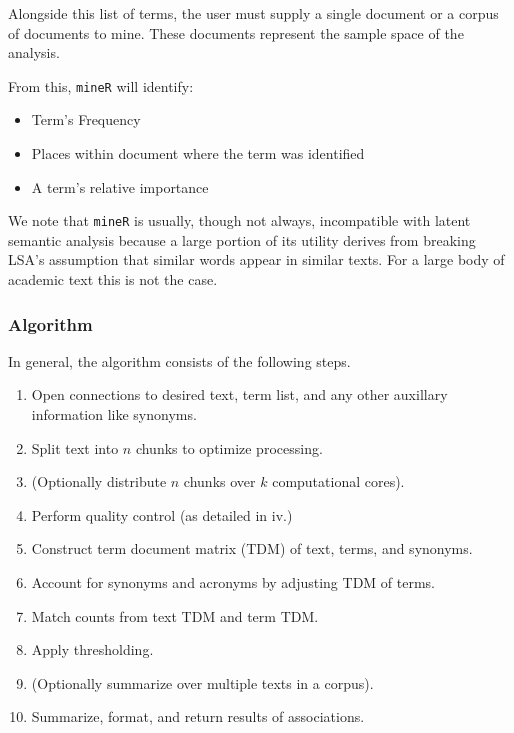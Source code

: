\documentclass[twoside]{article}
\begin{document}
Alongside this list of terms, the user must supply a single document or a corpus of documents to mine. These documents represent the sample space of the analysis.

From this, \texttt{mineR} will identify:

\begin{itemize}
\item Term's Frequency
\item Places within document where the term was identified
\item A term's relative importance

\end{itemize}

We note that \texttt{mineR} is usually, though not always, incompatible with latent semantic analysis because a large portion of its utility derives from breaking LSA's assumption that similar words appear in similar texts. For a large body of academic text this is not the case.

\subsubsection{Algorithm}

In general, the algorithm consists of the following steps.

\begin{enumerate}
\item Open connections to desired text, term list, and any other auxillary information like synonyms.
\item Split text into $n$ chunks to optimize processing.
\item (Optionally distribute $n$ chunks over $k$ computational cores).
\item Perform quality control (as detailed in iv.)
\item Construct term document matrix (TDM) of text, terms, and synonyms.
\item Account for synonyms and acronyms by adjusting TDM of terms.
\item Match counts from text TDM and term TDM.
\item Apply thresholding.
\item (Optionally summarize over multiple texts in a corpus).
\item Summarize, format, and return results of associations.
\end{enumerate}
\end{document}

